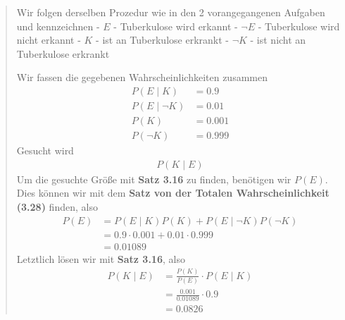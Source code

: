 \documentclass[
]{article}
\begin{document}
\begin{quote}
Wir folgen derselben Prozedur wie in den 2 vorangegangenen Aufgaben und
kennzeichnen - \(E\) - Tuberkulose wird erkannt - \(\lnot E\) -
Tuberkulose wird nicht erkannt - \(K\) - ist an Tuberkulose erkrankt -
\(\lnot K\) - ist nicht an Tuberkulose erkrankt

Wir fassen die gegebenen Wahrscheinlichkeiten zusammen \[\begin{align}
P(E\;|\;K) &= 0.9 \\
P(E\;|\;\lnot K) &= 0.01  \\
P(K) &= 0.001 \\
P(\lnot K) &= 0.999
\end{align}\] Gesucht wird \[\begin{align}
P(K\;|\;E) 
\end{align}\] Um die gesuchte Größe mit \textbf{Satz 3.16} zu finden,
benötigen wir \(P(E)\). Dies können wir mit dem \textbf{Satz von der
Totalen Wahrscheinlichkeit (3.28)} finden, also \[\begin{align}
P(E) &= P(E\;|\;K) P(K) + P(E\;|\;\lnot K)P(\lnot K) \\
&= 0.9 \cdot 0.001 + 0.01 \cdot 0.999 \\
&= 0.01089
\end{align}\] Letztlich lösen wir mit \textbf{Satz 3.16}, also
\[\begin{align}
P(K\;|\;E) &= \frac{P(K)}{P(E)} \cdot P(E\;|\;K) \\
&= \frac{0.001}{0.01089} \cdot 0.9 \\
&= 0.0826
\end{align}\]
\end{quote}
\end{document}
